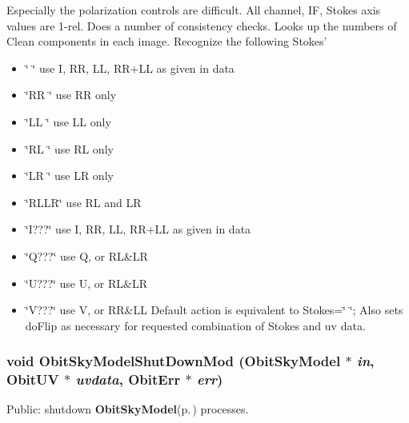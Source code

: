 Especially the polarization controls are difficult. All channel, IF, Stokes axis values are 1-rel. Does a number of consistency checks. Looks up the numbers of Clean components in each image. Recognize the following Stokes' \begin{itemize}
\item \char`\"{}    \char`\"{} use I, RR, LL, RR+LL as given in data \item \char`\"{}RR  \char`\"{} use RR only \item \char`\"{}LL  \char`\"{} use LL only \item \char`\"{}RL  \char`\"{} use RL only \item \char`\"{}LR  \char`\"{} use LR only \item \char`\"{}RLLR\char`\"{} use RL and LR \item \char`\"{}I???\char`\"{} use I, RR, LL, RR+LL as given in data \item \char`\"{}Q???\char`\"{} use Q, or RL\&LR \item \char`\"{}U???\char`\"{} use U, or RL\&LR \item \char`\"{}V???\char`\"{} use V, or RR\&LL Default action is equivalent to Stokes=\char`\"{} \char`\"{}; Also sets do\-Flip as necessary for requested combination of Stokes and uv data. 
\end{itemize}
\subsubsection{\setlength{\rightskip}{0pt plus 5cm}void Obit\-Sky\-Model\-Shut\-Down\-Mod ({\bf Obit\-Sky\-Model} $\ast$ {\em in}, {\bf Obit\-UV} $\ast$ {\em uvdata}, {\bf Obit\-Err} $\ast$ {\em err})}\label{ObitSkyModel_8c_a20}


Public: shutdown {\bf Obit\-Sky\-Model}{\rm (p.\,\pageref{structObitSkyModel})} processes. 

